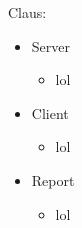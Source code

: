 Claus: 
\begin{itemize}
	\item Server
	\begin{itemize}
		\item lol
	\end{itemize}
	\item Client
	\begin{itemize}
		\item lol
	\end{itemize}
	\item Report
	\begin{itemize}
		\item lol
	\end{itemize}
\end{itemize}
